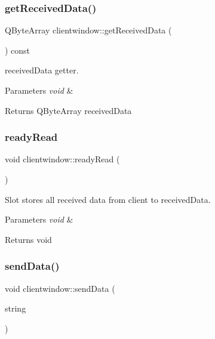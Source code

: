 \subsubsection{\texorpdfstring{get\+Received\+Data()}{getReceivedData()}}
{\footnotesize\ttfamily Q\+Byte\+Array clientwindow\+::get\+Received\+Data (\begin{DoxyParamCaption}{ }\end{DoxyParamCaption}) const}



received\+Data getter. 


\begin{DoxyParams}{Parameters}
{\em void} & \\
\hline
\end{DoxyParams}
\begin{DoxyReturn}{Returns}
Q\+Byte\+Array received\+Data 
\end{DoxyReturn}
\mbox{\label{classclientwindow_a0b2358b8e187213e045381ed2d582e3e}} 
\subsubsection{\texorpdfstring{ready\+Read}{readyRead}}
{\footnotesize\ttfamily void clientwindow\+::ready\+Read (\begin{DoxyParamCaption}{ }\end{DoxyParamCaption})\hspace{0.3cm}{\ttfamily [slot]}}



Slot stores all received data from client to received\+Data. 


\begin{DoxyParams}{Parameters}
{\em void} & \\
\hline
\end{DoxyParams}
\begin{DoxyReturn}{Returns}
void 
\end{DoxyReturn}
\mbox{\label{classclientwindow_af4fa9df47a939b45246e7686d0f8c569}} 
\subsubsection{\texorpdfstring{send\+Data()}{sendData()}}
{\footnotesize\ttfamily void clientwindow\+::send\+Data (\begin{DoxyParamCaption}\item[{Q\+Byte\+Array}]{string }\end{DoxyParamCaption})}



